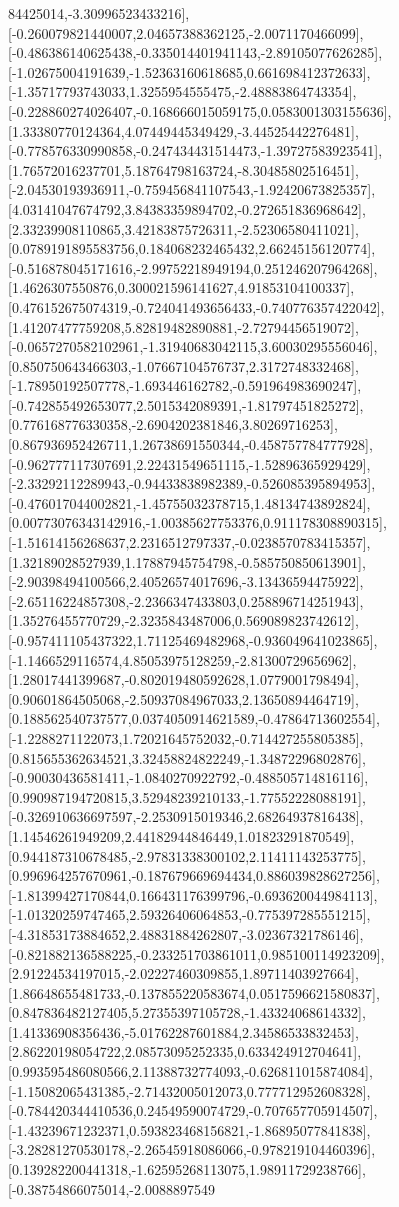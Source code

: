 \documentclass{article}
\begin{document}
84425014,-3.30996523433216],[-0.260079821440007,2.04657388362125,-2.0071170466099],[-0.486386140625438,-0.335014401941143,-2.89105077626285],[-1.02675004191639,-1.52363160618685,0.661698412372633],[-1.35717793743033,1.3255954555475,-2.48883864743354],[-0.228860274026407,-0.168666015059175,0.0583001303155636],[1.33380770124364,4.07449445349429,-3.44525442276481],[-0.778576330990858,-0.247434431514473,-1.39727583923541],[1.76572016237701,5.18764798163724,-8.30485802516451],[-2.04530193936911,-0.759456841107543,-1.92420673825357],[4.03141047674792,3.84383359894702,-0.272651836968642],[2.33239908110865,3.42183875726311,-2.52306580411021],[0.0789191895583756,0.184068232465432,2.66245156120774],[-0.516878045171616,-2.99752218949194,0.251246207964268],[1.4626307550876,0.300021596141627,4.91853104100337],[0.476152675074319,-0.724041493656433,-0.740776357422042],[1.41207477759208,5.82819482890881,-2.72794456519072],[-0.0657270582102961,-1.31940683042115,3.60030295556046],[0.850750643466303,-1.07667104576737,2.3172748332468],[-1.78950192507778,-1.693446162782,-0.591964983690247],[-0.742855492653077,2.5015342089391,-1.81797451825272],[0.776168776330358,-2.6904202381846,3.80269716253],[0.867936952426711,1.26738691550344,-0.458757784777928],[-0.962777117307691,2.22431549651115,-1.52896365929429],[-2.33292112289943,-0.94433838982389,-0.526085395894953],[-0.476017044002821,-1.45755032378715,1.48134743892824],[0.00773076343142916,-1.00385627753376,0.911178308890315],[-1.51614156268637,2.2316512797337,-0.0238570783415357],[1.32189028527939,1.17887945754798,-0.585750850613901],[-2.90398494100566,2.40526574017696,-3.13436594475922],[-2.65116224857308,-2.2366347433803,0.258896714251943],[1.35276455770729,-2.3235843487006,0.569089823742612],[-0.957411105437322,1.71125469482968,-0.936049641023865],[-1.1466529116574,4.85053975128259,-2.81300729656962],[1.28017441399687,-0.802019480592628,1.0779001798494],[0.90601864505068,-2.50937084967033,2.13650894464719],[0.188562540737577,0.0374050914621589,-0.47864713602554],[-1.2288271122073,1.72021645752032,-0.714427255805385],[0.815655362634521,3.32458824822249,-1.34872296802876],[-0.90030436581411,-1.0840270922792,-0.488505714816116],[0.990987194720815,3.52948239210133,-1.77552228088191],[-0.326910636697597,-2.2530915019346,2.68264937816438],[1.14546261949209,2.44182944846449,1.01823291870549],[0.944187310678485,-2.97831338300102,2.11411143253775],[0.996964257670961,-0.187679669694434,0.886039828627256],[-1.81399427170844,0.166431176399796,-0.693620044984113],[-1.01320259747465,2.59326406064853,-0.775397285551215],[-4.31853173884652,2.48831884262807,-3.02367321786146],[-0.821882136588225,-0.233251703861011,0.985100114923209],[2.91224534197015,-2.02227460309855,1.89711403927664],[1.86648655481733,-0.137855220583674,0.0517596621580837],[0.847836482127405,5.27355397105728,-1.43324068614332],[1.41336908356436,-5.01762287601884,2.34586533832453],[2.86220198054722,2.08573095252335,0.633424912704641],[0.993595486080566,2.11388732774093,-0.626811015874084],[-1.15082065431385,-2.71432005012073,0.777712952608328],[-0.784420344410536,0.24549590074729,-0.707657705914507],[-1.43239671232371,0.593823468156821,-1.86895077841838],[-3.28281270530178,-2.26545918086066,-0.978219104460396],[0.139282200441318,-1.62595268113075,1.98911729238766],[-0.38754866075014,-2.0088897549
\end{document}
